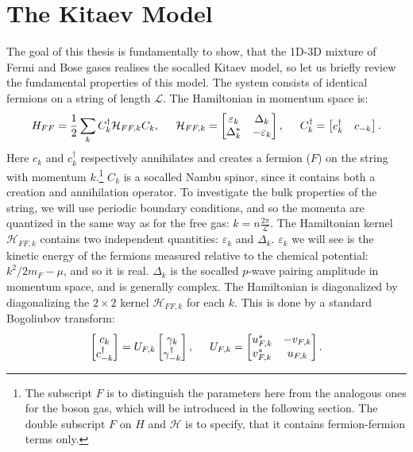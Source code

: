 \section{The Kitaev Model}
\label{sec.KitaevModel}
The goal of this thesis is fundamentally to show, that the 1D-3D mixture of Fermi and Bose gases realises the socalled Kitaev model, so let us briefly review the fundamental properties of this model. The system consists of identical fermions on a string of length $\mathcal{L}$. The Hamiltonian in momentum space is: 
\begin{equation}
H_{FF} = \frac{1}{2}\sum_{k} C^\dagger_k \mathcal{H}_{FF,k} C_k, \hspace{0.5cm} \mathcal{H}_{FF,k} = \begin{bmatrix} \varepsilon_k & \Delta_k \\ \Delta^*_k & -\varepsilon_k \end{bmatrix}, \hspace{0.5cm} C^\dagger_k = \begin{bmatrix} c_k^\dagger & c_{-k} \end{bmatrix}. 
\label{eq.HKitaevpre}
\end{equation}
Here $c_k$ and $c_k^\dagger$ respectively annihilates and creates a fermion ($F$) on the string with momentum $k$.\footnote{The subscript $F$ is to distinguish the parameters here from the analogous ones for the boson gas, which will be introduced in the following section. The double subscript $F$ on $H$ and $\mathcal{H}$ is to specify, that it contains fermion-fermion terms only.} $C_k$ is a socalled Nambu spinor, since it contains both a creation and annihilation operator. To investigate the bulk properties of the string, we will use periodic boundary conditions, and so the momenta are quantized in the same way as for the free gas: $k = n\frac{2\pi}{\mathcal{L}}$. The Hamiltonian kernel $\mathcal{H}_{FF,k}$ contains two independent quantities: $\varepsilon_k$ and $\Delta_k$. $\varepsilon_k$ we will see is the kinetic energy of the fermions measured relative to the chemical potential: $k^2/2m_F-\mu$, and so it is real. $\Delta_k$ is the socalled $p$-wave pairing amplitude in momentum space, and is generally complex. The Hamiltonian is diagonalized by diagonalizing the $2\times 2$ kernel $\mathcal{H}_{FF,k}$ for each $k$. This is done by a standard Bogoliubov transform: 
\begin{equation}
 \begin{bmatrix} c_k \\ c_{-k}^\dagger \end{bmatrix} = U_{F,k} \begin{bmatrix} \gamma_k \\ \gamma^\dagger_{-k} \end{bmatrix}, \hspace{0.5cm} U_{F,k} = \begin{bmatrix} u^*_{F,k} & -v_{F,k} \\ v^*_{F,k} & u_{F,k} \end{bmatrix}. 
 \label{eq.fermionquasiparticledef}
\end{equation}
